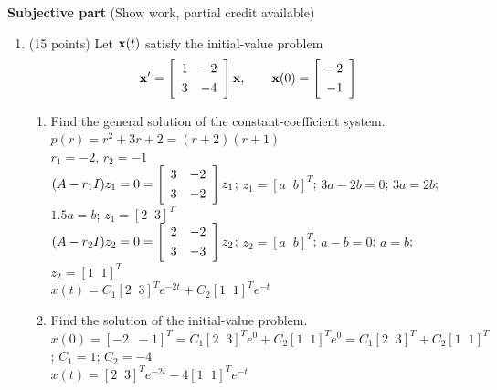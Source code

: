 \documentclass{article}
\begin{document}
\bigskip\bigskip\noindent
{\bf Subjective part} (Show work, partial credit available)

\begin{enumerate}

\item (15 points)  Let ${\bf x}(t)$ satisfy the initial-value problem
\[{\bf x}^\prime=\left[\begin{array}{cc}1&-2 \smallskip\\3&-4\end{array}\right]{\bf x},\qquad{\bf x}(0)=\left[\begin{array}{c}-2 \smallskip\\-1\end{array}\right]\]
\begin{enumerate}
\item
Find the general solution of the constant-coefficient system.
\\$p(r)=r^2+3r+2=(r+2)(r+1)$
\\$r_1=-2$, $r_2=-1$
\\$(A-r_1I)z_1=0=\left[\begin{array}{cc}3&-2 \smallskip\\3&-2\end{array}\right]z_1$; $z_1=[a\;\;b]^T$; $3a-2b=0$; $3a=2b$; $1.5a=b$;  $z_1=[2\;\;3]^T$
\\$(A-r_2I)z_2=0=\left[\begin{array}{cc}2&-2 \smallskip\\3&-3\end{array}\right]z_2$; $z_2=[a\;\;b]^T$; $a-b=0$; $a=b$; $z_2=[1\;\;1]^T$
\\$x(t)=C_1[2\;\;3]^Te^{-2t}+C_2[1\;\;1]^Te^{-t}$
\item
Find the solution of the initial-value problem.
\\$x(0)=[-2\;\;-1]^T=C_1[2\;\;3]^Te^{0}+C_2[1\;\;1]^Te^{0}=C_1[2\;\;3]^T+C_2[1\;\;1]^T$; $C_1=1$; $C_2=-4$
\\$x(t)=[2\;\;3]^Te^{-2t}-4[1\;\;1]^Te^{-t}$
\end{enumerate}





\end{enumerate}
\end{document}
